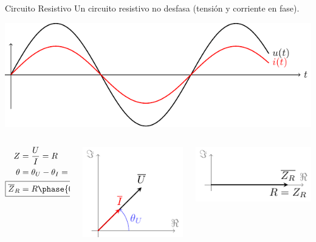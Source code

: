 \documentclass[aspectratio=169, usenames,svgnames,dvipsnames]{beamer}
\begin{document}
\begin{frame}[label={sec:orged95640}]{Circuito Resistivo}
Un circuito resistivo no desfasa (\alert{tensión y corriente en fase}).
\begin{center}
\includegraphics[height=0.3\textheight]{../figs/resistivo.pdf}
\end{center}

\begin{columns}
\begin{column}{0.3\columnwidth}
\begin{align*}
  Z &= \frac{U}{I} = R\\
  \theta &= \theta_U - \theta_I = 0\\
  \Aboxed{\overline{Z}_R &= R \phase{0}}
\end{align*}
\end{column}

\begin{column}{0.35\columnwidth}
\begin{center}
\includegraphics[height=0.35\textheight]{../figs/fasorResistencia_VI.pdf}
\end{center}
\end{column}


\begin{column}{0.35\columnwidth}
\begin{center}
\includegraphics[height=0.25\textheight]{../figs/fasorResistencia.pdf}
\end{center}
\end{column}
\end{columns}
\end{frame}
\end{document}
